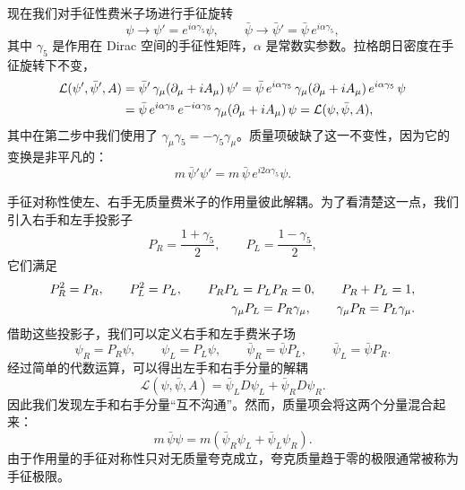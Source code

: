 现在我们对手征性费米子场进行手征旋转
\begin{equation}
  \psi \to \psi' = e^{i\alpha\gamma_5}\psi,
  \qquad
  \bar\psi \to \bar\psi' = \bar\psi\,e^{i\alpha\gamma_5},
\end{equation}
其中 $\gamma_5$ 是作用在 Dirac 空间的手征性矩阵，$\alpha$ 是常数实参数。拉格朗日密度在手征旋转下不变，
\begin{align}
  \mathcal{L}(\psi',\bar\psi',A)
  &= \bar\psi'\,\gamma_\mu(\partial_\mu + iA_\mu)\,\psi'
  = \bar\psi\,e^{i\alpha\gamma_5}\,\gamma_\mu(\partial_\mu + iA_\mu)\,e^{i\alpha\gamma_5}\,\psi \notag\\
  &= \bar\psi\,e^{i\alpha\gamma_5}\,e^{-i\alpha\gamma_5}\,\gamma_\mu(\partial_\mu + iA_\mu)\,\psi
  = \mathcal{L}(\psi,\bar\psi,A),
\end{align}
其中在第二步中我们使用了 $\gamma_\mu\gamma_5 = -\gamma_5\gamma_\mu$。质量项破缺了这一不变性，因为它的变换是非平凡的：
\begin{equation}
  m\,\bar\psi'\psi' = m\,\bar\psi\,e^{i2\alpha\gamma_5}\psi.
\end{equation}

手征对称性使左、右手无质量费米子的作用量彼此解耦。为了看清楚这一点，我们引入右手和左手投影子
\begin{equation}
  P_R = \frac{1+\gamma_5}{2},
  \qquad
  P_L = \frac{1-\gamma_5}{2},
\end{equation}
它们满足
\begin{align}
  P_R^2 = P_R,\qquad P_L^2 = P_L, \qquad P_R P_L = P_L P_R = 0, \qquad P_R + P_L = 1,
  \notag\\
  \gamma_\mu P_L = P_R\gamma_\mu, \qquad \gamma_\mu P_R = P_L\gamma_\mu .
\end{align}
借助这些投影子，我们可以定义右手和左手费米子场
\begin{equation}
  \psi_R = P_R\psi, \qquad \psi_L = P_L\psi,
  \qquad
  \bar\psi_R = \bar\psi P_L, \qquad \bar\psi_L = \bar\psi P_R .
\end{equation}
经过简单的代数运算，可以得出左手和右手分量的解耦
\begin{equation}
  \mathcal{L}(\psi,\bar\psi,A) = \bar\psi_L D\psi_L + \bar\psi_R D\psi_R .
\end{equation}
因此我们发现左手和右手分量``互不沟通''。然而，质量项会将这两个分量混合起来：
\begin{equation}
  m\,\bar\psi\psi = m\left(\bar\psi_R\psi_L + \bar\psi_L\psi_R\right).
\end{equation}
由于作用量的手征对称性只对无质量夸克成立，夸克质量趋于零的极限通常被称为手征极限。


